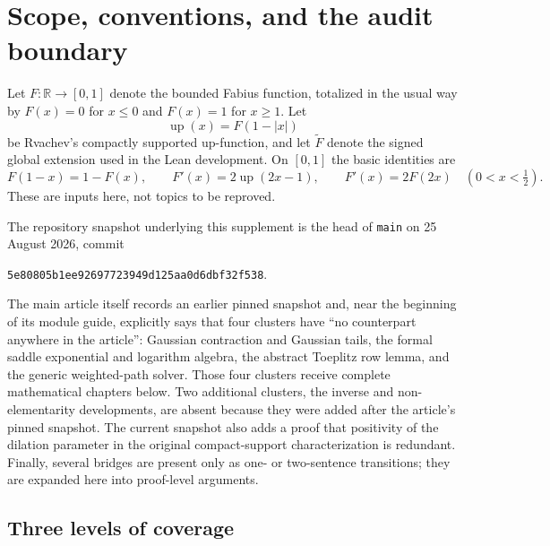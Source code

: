 \documentclass[11pt,oneside]{article}
\theoremstyle{definition}
\theoremstyle{remark}
\newcommand{\R}{\mathbb R}
\newcommand{\Up}{\operatorname{up}}
\begin{document}
\tableofcontents
\clearpage

\section{Scope, conventions, and the audit boundary}
\label{sec:scope}

Let $F:\R\to[0,1]$ denote the bounded Fabius function, totalized in the usual way by
$F(x)=0$ for $x\le0$ and $F(x)=1$ for $x\ge1$.  Let
\begin{equation}
 \Up(x)=F(1-|x|)
 \label{eq:up-fold-supp}
\end{equation}
be Rvachev's compactly supported up-function, and let $\widetilde F$ denote the signed
global extension used in the Lean development.  On $[0,1]$ the basic identities are
\begin{equation}
 F(1-x)=1-F(x),
 \qquad
 F'(x)=2\Up(2x-1),
 \qquad
 F'(x)=2F(2x)\quad(0<x<\tfrac12).
 \label{eq:basic-inputs}
\end{equation}
These are inputs here, not topics to be reproved.

The repository snapshot underlying this supplement is the head of \texttt{main} on
25 August 2026, commit
\begin{center}
 \texttt{5e80805b1ee92697723949d125aa0d6dbf32f538}.
\end{center}
The main article itself records an earlier pinned snapshot and, near the beginning of its
module guide, explicitly says that four clusters have ``no counterpart anywhere in the
article'': Gaussian contraction and Gaussian tails, the formal saddle exponential and
logarithm algebra, the abstract Toeplitz row lemma, and the generic weighted-path solver.
Those four clusters receive complete mathematical chapters below.  Two additional clusters,
the inverse and non-elementarity developments, are absent because they were added after the
article's pinned snapshot.  The current snapshot also adds a proof that positivity of the
dilation parameter in the original compact-support characterization is redundant.  Finally,
several bridges are present only as one- or two-sentence transitions; they are expanded here
into proof-level arguments.

\subsection{Three levels of coverage}
\end{document}
